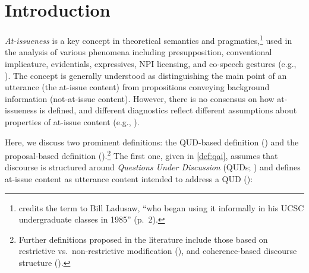 \documentclass[times,linguex]{glossa}
\begin{document}
\section{Introduction} \label{sec:1_introduction}
\textit{At-issueness} is a key concept in theoretical semantics and pragmatics,\footnote{\citet{potts_presupposition_2015} credits the term to Bill Ladusaw, \enquote{who began using it informally in his UCSC undergraduate classes in 1985} (p.~2).} used in the analysis of various phenomena including presupposition, conventional implicature, evidentials, expressives, NPI licensing, and co-speech gestures (e.g., \citealt{faller_semantics_2002,faller_discourse_2019,horn_assertoric_2002,potts_logic_2005,simons_what_2010,lee_evidentiality_2011,tonhauser_how_2018,esipova_composition_2019,korotkova_evidential_2020,barnes_information_2023}). The concept is generally understood as distinguishing the main point of an utterance (the at-issue content) from propositions conveying background information (not-at-issue content). However, there is no consensus on how at-issueness is defined, and different diagnostics reflect different assumptions about properties of at-issue content (e.g., \citealt{tonhauser_diagnosing_2012,snider_at-issueness_2017,snider_anaphoric_2017,snider_distinguishing_2018,tonhauser_how_2018,koev_notions_2018,faller_discourse_2019,esipova_composition_2019,korotkova_evidential_2020}). %

Here, we discuss two prominent definitions: the QUD-based definition (\citealp{amaral_review_2007,simons_what_2010}) and the proposal-based definition (\citealt{murray_evidentiality_2010,murray_varieties_2014,anderbois_crossing_2010,anderbois_at-issue_2015,koev_apposition_2013}).\footnote{Further definitions proposed in the literature include those based on restrictive vs.\ non-restrictive modification (\citealt{esipova_composition_2019,esipova_not-at-issueness_2021}), and coherence-based discourse structure (\citealt{hunter_shapes_2016,jasinskaja_not_2016,koev_notions_2018}). %
} The first one, given in \ref{def:qai}, assumes that discourse is structured around \textit{Questions Under Discussion} (QUDs; \citealt{roberts_information_2012,ginzburg_interrogatives_1996}) and defines at-issue content as utterance content intended to address a QUD (\citealp{amaral_review_2007,simons_what_2010}):
\end{document}
